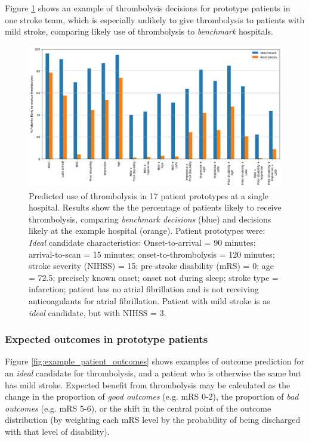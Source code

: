 Figure \ref{fig:thrombolysis_rates_prototype_patients_team_x} shows an example of thrombolysis decisions for prototype patients in one stroke team, which is especially unlikely to give thrombolysis to patients with mild stroke, comparing likely use of thrombolysis to \textit{benchmark} hospitals.

\begin{figure}
    \centering
    \includegraphics[width=1\linewidth]{images/prototype_patients_team_x.png}
    \caption{Predicted use of thrombolysis in 17 patient prototypes at a single hospital. Results show the the percentage of patients likely to receive thrombolysis, comparing \textit{benchmark decisions} (blue) and decisions likely at the example hospital (orange). Patient prototypes were: \textit{Ideal} candidate characteristics: Onset-to-arrival = 90 minutes; arrival-to-scan = 15 minutes; onset-to-thrombolysis = 120 minutes; stroke severity (NIHSS) = 15; pre-stroke disability (mRS) = 0; age = 72.5; precisely known onset; onset not during sleep; stroke type = infarction; patient has no atrial fibrillation and is not receiving anticoagulants for atrial fibrillation. Patient with mild stroke is as \textit{ideal} candidate, but with NIHSS = 3.}
    \label{fig:thrombolysis_rates_prototype_patients_team_x}
\end{figure}


\subsubsection{Expected outcomes in prototype patients}

Figure \ref{fig:example_patient_outcomes} shows examples of outcome prediction for an \textit{ideal} candidate for thrombolysis, and a patient who is otherwise the same but has mild stroke. Expected benefit from thrombolysis may be calculated as the change in the proportion of \textit{good outcomes} (e.g. mRS 0-2), the proportion of \textit{bad outcomes} (e.g. mRS 5-6), or the shift in the central point of the outcome distribution (by weighting each mRS level by the probability of being discharged with that level of disability). 


